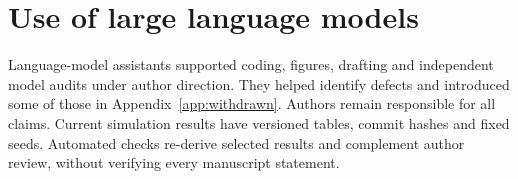 \section{Use of large language models}
\label{app:llm}
Language-model assistants supported coding, figures, drafting and independent
model audits under author direction. They helped identify defects and introduced
some of those in Appendix~\ref{app:withdrawn}. Authors remain responsible for
all claims. Current simulation results have versioned tables, commit hashes
and fixed seeds. Automated checks
re-derive selected results and complement author review, without verifying
every manuscript statement.
